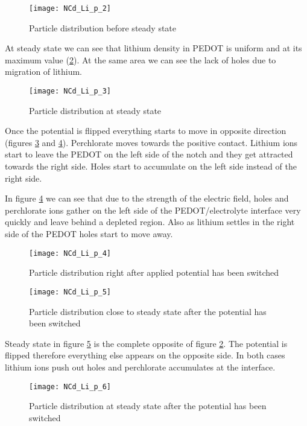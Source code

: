 \begin{figure}[!htp]
\centering
\texttt{[image: NCd\_Li\_p\_2]}
\caption{Particle distribution before steady state} 
\label{NCD_Li_p_2}
\end{figure}

At steady state we can see that lithium density in PEDOT is uniform and at its maximum value (\ref{NCd_Li_p_3}). At the same area we can see the lack of holes due to migration of lithium.
 
\begin{figure}[!htp]
\centering
\texttt{[image: NCd\_Li\_p\_3]}
\caption{Particle distribution at steady state} 
\label{NCd_Li_p_3}
\end{figure}

Once the potential is flipped everything starts to move in opposite direction (figures \ref{NCd_Li_p_4} and \ref{NCd_Li_p_5}). Perchlorate moves towards the positive contact. Lithium ions start to leave the PEDOT on the left side of the notch and they get attracted towards the right side. Holes start to accumulate on the left side instead of the right side.

In figure \ref{NCd_Li_p_5} we can see that due to the strength of the electric field, holes and perchlorate ions gather on the left side of the PEDOT/electrolyte interface very quickly and leave behind a depleted region. Also as lithium settles in the right side of the PEDOT holes start to move away.

\begin{figure}[!htp]
\centering
\texttt{[image: NCd\_Li\_p\_4]}
\caption{Particle distribution right after applied potential has been switched} 
\label{NCd_Li_p_4}
\end{figure}

\begin{figure}[!htp]
\centering
\texttt{[image: NCd\_Li\_p\_5]}
\caption{Particle distribution close to steady state after the potential has been switched} 
\label{NCd_Li_p_5}
\end{figure}

Steady state in figure \ref{NCd_Li_p_6} is the complete opposite of figure \ref{NCd_Li_p_3}. The potential is flipped therefore everything else appears on the opposite side. In both cases lithium ions push out holes and perchlorate accumulates at the interface.

\begin{figure}[!htp]
\centering
\texttt{[image: NCd\_Li\_p\_6]}
\caption{Particle distribution at steady state after the potential has been switched} 
\label{NCd_Li_p_6}
\end{figure}

